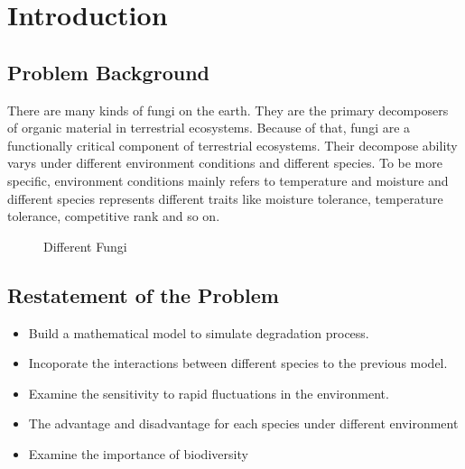 \section{Introduction}
	\subsection{Problem Background}
	There are many kinds of fungi on the earth. They are the primary decomposers of organic material in terrestrial ecosystems. Because of that, fungi are a functionally critical component of terrestrial ecosystems. Their decompose ability varys under different environment conditions and different species. To be more specific, environment conditions mainly refers to temperature and moisture and different species represents different traits like moisture tolerance, temperature tolerance, competitive rank and so on.
	
\begin{figure}[htbp]
\centering
{}%
%
%
\centering
\caption{Different Fungi}
\end{figure}

	
	\subsection{Restatement of the Problem}
	\begin{itemize}
		\item Build a mathematical model to simulate degradation process.
		\item Incoporate the interactions between different species to the previous model.
		\item Examine the sensitivity to rapid fluctuations in the environment.
		\item The advantage and disadvantage for each species under different environment
		\item Examine the importance of biodiversity
	\end{itemize}
	
